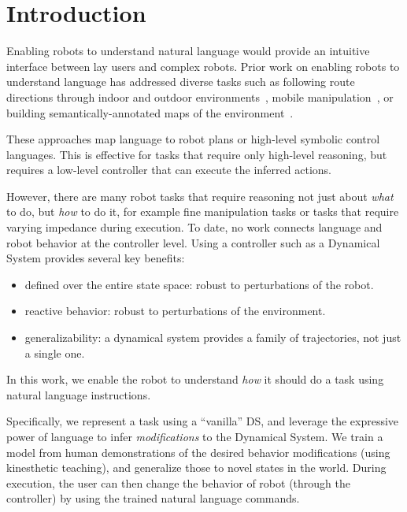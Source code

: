 \section{Introduction}
\label{secIntroduction}


Enabling robots to understand natural language would provide an intuitive interface between lay users and complex robots.
Prior work on enabling robots to understand language has addressed diverse tasks such as following route directions through indoor and outdoor environments~\cite{macmahon06, kollar10, matuszek12a, duvallet13, boularias15}, mobile manipulation~\cite{tellex11, howard14a}, or building semantically-annotated maps of the environment~\cite{walter13}.




These approaches map language to robot plans or high-level symbolic control languages.
This is effective for tasks that require only high-level reasoning, but requires a low-level controller that can execute the inferred actions.

However, there are many robot tasks that require reasoning not just about \emph{what} to do, but \emph{how} to do it, for example fine manipulation tasks or tasks that require varying impedance during execution.
To date, no work connects language and robot behavior at the controller level.
Using a controller such as a Dynamical System provides several key benefits:
\begin{itemize}
\item defined over the entire state space: robust to perturbations of the robot.
\item reactive behavior: robust to perturbations of the environment.
\item generalizability: a dynamical system provides a family of trajectories, not just a single one.
\end{itemize}



In this work, we enable the robot to understand \emph{how} it should do a task using natural language instructions.

Specifically, we represent a task using a ``vanilla'' DS, and leverage the expressive power of language to infer \emph{modifications} to the Dynamical System.
We train a model from human demonstrations of the desired behavior modifications (using kinesthetic teaching), and generalize those to novel states in the world.
During execution, the user can then change the behavior of robot (through the controller) by using the trained natural language commands.



